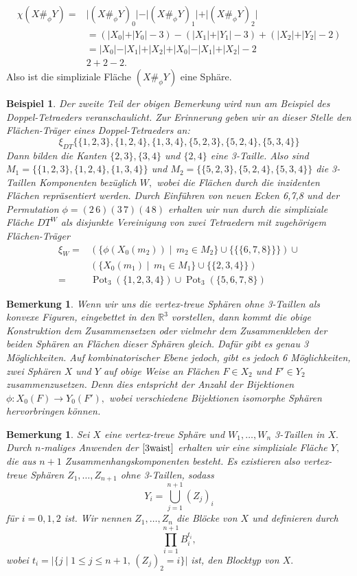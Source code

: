 \documentclass[12pt,titlepage,twoside,cleardoublepage]{article}
\theoremstyle{nummermitklammern}
\newtheorem{bsp}[temp]{Beispiel}
\newtheorem{bemerkung}[temp]{Bemerkung}
\newtheorem{bsp}[zahl]{Beispiel}
\newtheorem{bemerkung}[zahl]{Bemerkung}
\numberwithin{equation}{section}
\DeclareMathOperator{\Pot}{Pot}
\begin{document}
\begin{align*}
\chi(X\#_\phi Y)=&\vert(X\#_\phi Y)_0\vert -\vert (X\#_\phi Y)_1\vert +\vert (X\#_\phi Y)_2\vert\\
&=(\vert X_0\vert+\vert Y_0\vert-3)-(\vert X_1\vert+\vert Y_1\vert-3)+(\vert X_2\vert+\vert Y_2\vert-2)\\ 
&=\vert X_0\vert-\vert X_1\vert+\vert X_2\vert+\vert X_0\vert-\vert X_1\vert+\vert X_2\vert-2\\
&2+2-2.
\end{align*}
Also ist die simpliziale Fläche $(X\#_\phi Y)$ eine Sphäre. 
\begin{bsp}
Der zweite Teil der obigen Bemerkung wird nun am Beispiel des Doppel-Tetraeders veranschaulicht.
Zur Erinnerung geben wir an dieser Stelle den Flächen-Träger eines Doppel-Tetraeders an:
\[
\xi_{DT}\{\{1,2,3\},\{1,2,4\},\{1,3,4\},\{5,2,3\},\{5,2,4\},\{5,3,4\}\}
\]
Dann bilden die Kanten $\{2,3\},\{3,4\}$ und $\{2,4\}$ eine 3-Taille. Also sind $M_1=\{\{1,2,3\},\{1,2,4\},\{1,3,4\}\}$ und $M_2=\{\{5,2,3\},\{5,2,4\},\{5,3,4\}\}$ die 3-Taillen Komponenten bezüglich $W,$ wobei die Flächen durch die inzidenten Flächen repräsentiert werden. Durch Einführen von neuen Ecken 6,7,8 und der Permutation $\phi=(2\, 6)(3\, 7)(4\,8)$ erhalten wir nun durch die simpliziale Fläche $DT^W$ als disjunkte Vereinigung von zwei Tetraedern mit zugehörigem Flächen-Träger
\begin{align*}
\xi_W=&(\{\phi(X_0(m_2))\mid \, m_2\in M_2\}\cup \{\{\{6,7,8\}\}\}) \cup \\
&(\{X_0(m_1)\mid \, m_1\in M_1\}\cup \{\{2,3,4\}\})\\
=&\Pot_3(\{1,2,3,4\})\cup \Pot_3(\{5,6,7,8\})
\end{align*}
\end{bsp}
\begin{bemerkung}
Wenn wir uns die vertex-treue Sphären ohne 3-Taillen als konvexe Figuren, eingebettet in den $\mathbb{R}^3$ vorstellen, dann kommt die obige Konstruktion dem Zusammensetzen oder vielmehr dem Zusammenkleben der beiden Sphären an Flächen dieser Sphären gleich. Dafür gibt es genau 3 Möglichkeiten. Auf kombinatorischer Ebene jedoch, gibt es jedoch 6 Möglichkeiten, zwei Sphären $X$ und $Y$ auf obige Weise an 
Flächen $F\in X_2$ und $F'\in Y_2$ zusammenzusetzen. Denn dies entspricht der Anzahl der Bijektionen $\phi:X_0(F)\to Y_0(F'),$ wobei verschiedene Bijektionen isomorphe Sphären hervorbringen können.
\end{bemerkung}
\begin{bemerkung}
Sei $X$ eine vertex-treue Sphäre und $W_1,\ldots,W_n$ 3-Taillen in $X.$ Durch  $n$-maliges Anwenden der $\Cref{3waist}$ erhalten wir eine simpliziale Fläche $Y,$ die aus $n+1$ Zusammenhangskomponenten besteht. Es existieren also vertex-treue Sphären $Z_1,\ldots,Z_{n+1}$ ohne 3-Taillen, sodass
\[
Y_i=\bigcup_{j=1}^{n+1}(Z_j)_i 
\]
für $i=0,1,2$ ist. Wir nennen $Z_1,\ldots,Z_n$ die \emph{Blöcke} von $X$ und definieren durch 
\[
\prod_{i=1}^{n+1} B_i^{t_i},
\]
wobei $t_i=\vert\{j \mid 1\leq j\leq n+1,\,(Z_j)_2=i\}\vert$ ist, den \emph{Blocktyp} von $X.$
\end{bemerkung}
\end{document}
